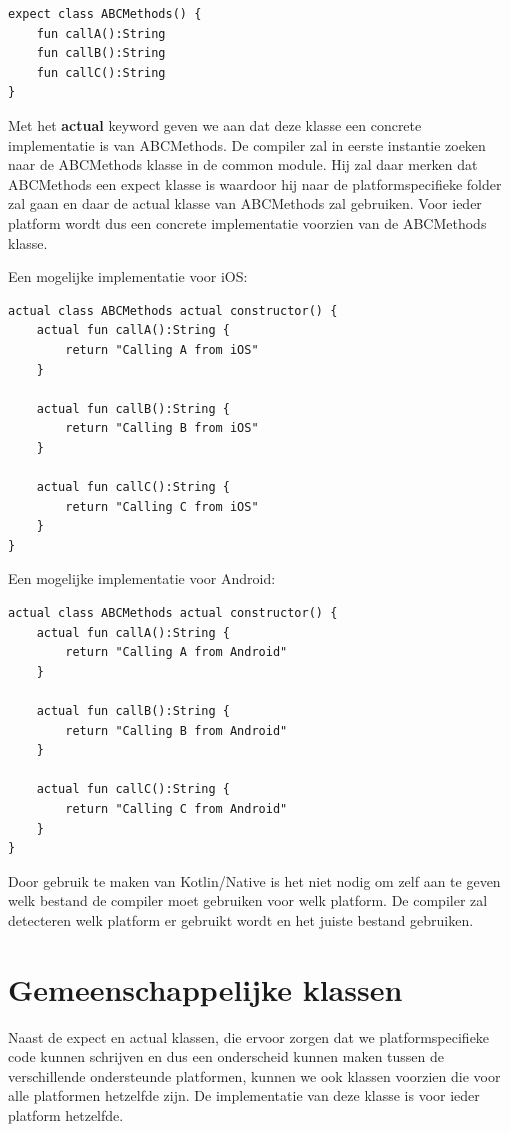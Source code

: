 \begin{lstlisting}
expect class ABCMethods() {
	fun callA():String
	fun callB():String
	fun callC():String
}
\end{lstlisting}

Met het \textbf{actual} keyword geven we aan dat deze klasse een concrete implementatie is van ABCMethods. De compiler zal in eerste instantie zoeken naar de ABCMethods klasse in de common module. Hij zal daar merken dat ABCMethods een expect klasse is waardoor hij naar de platformspecifieke folder zal gaan en daar de actual klasse van ABCMethods zal gebruiken. Voor ieder platform wordt dus een concrete implementatie voorzien van de ABCMethods klasse.

Een mogelijke implementatie voor iOS:
\begin{lstlisting}
actual class ABCMethods actual constructor() {
	actual fun callA():String {
		return "Calling A from iOS"
	}
	
	actual fun callB():String {
		return "Calling B from iOS"
	}
	
	actual fun callC():String {
		return "Calling C from iOS"
	}
}
\end{lstlisting}

Een mogelijke implementatie voor Android:
\begin{lstlisting}
actual class ABCMethods actual constructor() {
	actual fun callA():String {
		return "Calling A from Android"
	}
	
	actual fun callB():String {
		return "Calling B from Android"
	}
	
	actual fun callC():String {
		return "Calling C from Android"
	}
}
\end{lstlisting}

Door gebruik te maken van Kotlin/Native is het niet nodig om zelf aan te geven welk bestand de compiler moet gebruiken voor welk platform. De compiler zal detecteren welk platform er gebruikt wordt en het juiste bestand gebruiken.

\section{Gemeenschappelijke klassen}
Naast de expect en actual klassen, die ervoor zorgen dat we platformspecifieke code kunnen schrijven en dus een onderscheid kunnen maken tussen de verschillende ondersteunde platformen, kunnen we ook klassen voorzien die voor alle platformen hetzelfde zijn. De implementatie van deze klasse is voor ieder platform hetzelfde.

